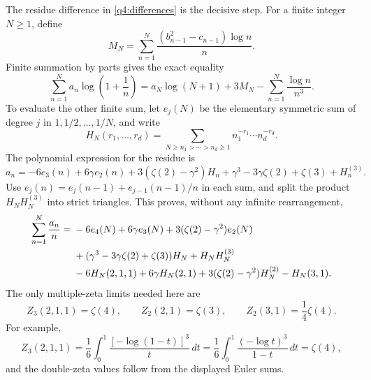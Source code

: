 \documentclass[11pt,a4paper]{article}
\numberwithin{equation}{section}
\theoremstyle{definition}
\theoremstyle{remark}
\begin{document}
The residue difference in \eqref{q4:differences} is the decisive step.
For a finite integer $N\geq1$, define
\[
 M_N=\sum_{n=1}^N
             \frac{(b_{n-1}^2-c_{n-1})\log n}{n}.
\]
Finite summation by parts gives the exact equality
\begin{equation}\label{q4:logsum}
 \sum_{n=1}^N a_n\log\left(1+\frac1n\right)
       =a_N\log(N+1)+3M_N-\sum_{n=1}^N\frac{\log n}{n^3}.
\end{equation}
To evaluate the other finite sum, let $e_j(N)$ be the elementary symmetric
sum of degree $j$ in $1,1/2,\ldots,1/N$, and write
\[
 H_N(r_1,\ldots,r_d)
  =\sum_{N\geq n_1>\cdots>n_d\geq1}
         n_1^{-r_1}\cdots n_d^{-r_d}.
\]
The polynomial expression for the residue is
\begin{equation}\label{q4:elementary}
 a_n=-6e_3(n)+6\gamma e_2(n)+3(\zeta(2)-\gamma^2)H_n
           +\gamma^3-3\gamma\zeta(2)+\zeta(3)+H_n^{(3)}.
\end{equation}
Use $e_j(n)=e_j(n-1)+e_{j-1}(n-1)/n$ in each sum, and split the
product $H_NH_N^{(3)}$ into strict triangles.  This proves, without
any infinite rearrangement,
\begin{align}\label{q4:finitesum}
 \sum_{n=1}^N\frac{a_n}{n}
 ={}&-6e_4(N)+6\gamma e_3(N)+3(\zeta(2)-\gamma^2)e_2(N)\notag\\
 &+(\gamma^3-3\gamma\zeta(2)+\zeta(3))H_N+H_NH_N^{(3)}\notag\\
 &-6H_N(2,1,1)+6\gamma H_N(2,1)
       +3(\zeta(2)-\gamma^2)H_N^{(2)}-H_N(3,1).
\end{align}
The only multiple-zeta limits needed here are
\[
 Z_3(2,1,1)=\zeta(4),\qquad
 Z_2(2,1)=\zeta(3),\qquad
 Z_2(3,1)=\frac14\zeta(4).
\]
For example,
\[
 Z_3(2,1,1)=\frac16\int_0^1\frac{[-\log(1-t)]^3}{t}\,dt
           =\frac16\int_0^1\frac{(-\log t)^3}{1-t}\,dt
           =\zeta(4),
\]
and the double-zeta values follow from the displayed Euler sums.
\end{document}

